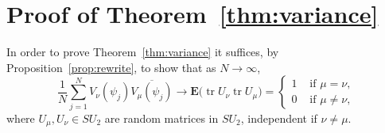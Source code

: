 \documentclass[12pt]{amsart}
\theoremstyle{plain}
\newcommand{\trace}{\operatorname{tr}}
\newcommand{\T}{\TN}
\newcommand{\TN}{T_N}  %
\renewcommand{\^}{\widehat}
\newcommand{\Ex}{\mathbf E}
\newcommand{\V}[1]{V_{#1}(\psi_j)}
\newcommand{\vnn}{\nu}
\newcommand{\vnm}{\mu}
\begin{document}
\section{Proof of Theorem~\ref{thm:variance}}

In order to prove Theorem~\ref{thm:variance}
it suffices, by Proposition~\ref{prop:rewrite},
to show that as $N\to\infty$, 
$$
\frac{1}{N}
\sum_{j=1}^N
\V{\vnn}
\overline{\V{\vnm}}
\to %
\Ex \big(\trace U_\vnn \trace U_\vnm \big) 
=\begin{cases} 1& \text{ if } \vnm = \vnn, \\
0& \text{ if } \vnm\neq \vnn, \end{cases}
$$
where $U_\vnm, U_{\vnn} \in SU_2$ are  random
matrices in $SU_2$, independent if $\vnn \neq \vnm$.


\end{document}
